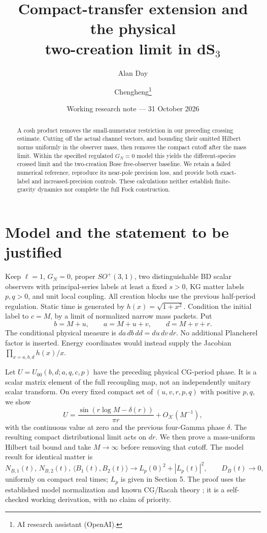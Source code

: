 \documentclass[11pt,a4paper]{article}
\title{Compact-transfer extension and the physical\\two-creation limit in dS$_3$}
\author{Alan Day \and Chengheng\thanks{AI research assistant (OpenAI).}}
\date{Working research note --- 31 October 2026}
\begin{document}
\maketitle
\begin{abstract}
A cosh product removes the small-numerator restriction in our preceding
crossing estimate. Cutting off the actual channel vectors, and bounding
their omitted Hilbert norms uniformly in the observer mass, then removes
the compact cutoff after the mass limit. Within the specified regulated
$G_N=0$ model this yields the different-species crossed limit and the
two-creation Bose free-observer baseline. We retain a failed numerical
reference, reproduce its near-pole precision loss, and provide both
exact-label and increased-precision controls. These calculations neither
establish finite-gravity dynamics nor complete the full Fock construction.
\end{abstract}

\section{Model and the statement to be justified}
Keep $\ell=1$, $G_N=0$, proper $SO^+(3,1)$, two distinguishable BD
scalar observers with principal-series labels at least a fixed $s>0$,
KG matter labels $p,q>0$, and unit local coupling.
All creation blocks use the previous half-period regulation.
Static time is generated by $h(x)=\sqrt{1+x^2}$.
Condition the initial label to $c=M$, by a limit of normalized narrow
mass packets. Put
\[
 b=M+u,\qquad a=M+u+v,\qquad d=M+v+r.
\]
The conditional physical measure is $da\,db\,dd=du\,dv\,dr$.
No additional Plancherel factor is inserted. Energy coordinates would
instead supply the Jacobian $\prod_{x=a,b,d}h(x)/x$.

Let $U=U_{00}(b,d;a,q,c,p)$ have the preceding physical CG-period phase.
It is a scalar matrix element of the full recoupling map, not an
independently unitary scalar transform. On every fixed compact set of
$(u,v,r,p,q)$ with positive $p,q$, we show
\begin{equation}
 U=\frac{\sin(r\log M-\delta(r))}{\pi r}+O_{\mathcal K}(M^{-1}),
 \label{kernel}
\end{equation}
with the continuous value at zero and the previous four-Gamma phase
$\delta$. The resulting compact distributional limit acts on $dr$.
We then prove a mass-uniform Hilbert tail bound and take $M\to\infty$
before removing that cutoff. The model result for identical matter is
\[
 N_{B,1}(t),\,N_{B,2}(t),\,\langle B_1(t),B_2(t)\rangle
 \longrightarrow L_p(0)^2+|L_p(t)|^2,\qquad D_B(t)\longrightarrow0,
\]
uniformly on compact real times; $L_p$ is given in Section 5.
The proof uses the established model normalization \cite{prior}
and known CG/Racah theory \cite{ds,lprs}; it is a self-checked working
derivation, with no claim of priority.
\end{document}
